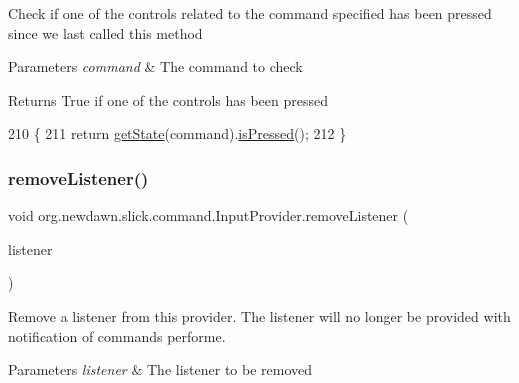 Check if one of the controls related to the command specified has been pressed since we last called this method


\begin{DoxyParams}{Parameters}
{\em command} & The command to check \\
\hline
\end{DoxyParams}
\begin{DoxyReturn}{Returns}
True if one of the controls has been pressed 
\end{DoxyReturn}

\begin{DoxyCode}
210                                                             \{
211         \textcolor{keywordflow}{return} \mbox{\hyperlink{classorg_1_1newdawn_1_1slick_1_1command_1_1_input_provider_aa25975d0cc21a4d1a45995c553e72357}{getState}}(command).\mbox{\hyperlink{classorg_1_1newdawn_1_1slick_1_1command_1_1_input_provider_1_1_command_state_a8216987ce9b6ed4abf545af323b341bc}{isPressed}}();
212     \}
\end{DoxyCode}
\mbox{\label{classorg_1_1newdawn_1_1slick_1_1command_1_1_input_provider_ae6178aceb952f89deca034a74a2fd160}} 
\subsubsection{\texorpdfstring{remove\+Listener()}{removeListener()}}
{\footnotesize\ttfamily void org.\+newdawn.\+slick.\+command.\+Input\+Provider.\+remove\+Listener (\begin{DoxyParamCaption}\item[{\mbox{\hyperlink{interfaceorg_1_1newdawn_1_1slick_1_1command_1_1_input_provider_listener}{Input\+Provider\+Listener}}}]{listener }\end{DoxyParamCaption})\hspace{0.3cm}{\ttfamily [inline]}}

Remove a listener from this provider. The listener will no longer be provided with notification of commands performe.


\begin{DoxyParams}{Parameters}
{\em listener} & The listener to be removed \\
\hline
\end{DoxyParams}


